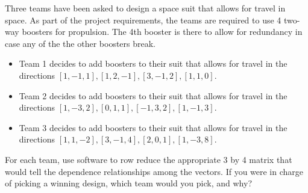 \begin{problem}
%
Three teams have been asked to design a space suit that allows for travel in space. As part of the project requirements, the teams are required to use 4 two-way boosters for propulsion.  The 4th booster is there to allow for redundancy in case any of the the other boosters break. 
\begin{itemize}
 \item Team 1 decides to add boosters to their suit that allows for travel in the directions 
$[1,-1,1],
[1,2,-1],
[3,-1,2],
[1,1,0]$.
 \item Team 2 decides to add boosters to their suit that allows for travel in the directions 
$[1,-3,2],
[0,1,1],
[-1,3,2],
[1,-1,3]$.
 \item Team 3 decides to add boosters to their suit that allows for travel in the directions
$[1,1,-2],
[3,-1,4],
[2,0,1],
[1,-3,8]$.
\end{itemize}
For each team, use software to row reduce the appropriate 3 by 4 matrix that would tell the dependence relationships among the vectors. If you were in charge of picking a winning design, which team would you pick, and why?
\end{problem}


\mysubsection{\ideamul}

